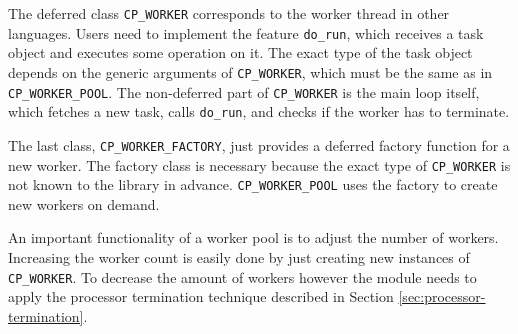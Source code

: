 The deferred class \lstinline!CP_WORKER! corresponds to the worker thread in other languages.
Users need to implement the feature \lstinline!do_run!, which receives a task object and executes some operation on it.
The exact type of the task object depends on the generic arguments of \lstinline!CP_WORKER!, which must be the same as in \lstinline!CP_WORKER_POOL!.
The non-deferred part of \lstinline!CP_WORKER! is the main loop itself, which fetches a new task, calls \lstinline!do_run!, and checks if the worker has to terminate.

The last class, \lstinline!CP_WORKER_FACTORY!, just provides a deferred factory function for a new worker.
The factory class is necessary because the exact type of \lstinline!CP_WORKER! is not known to the library in advance.
\lstinline!CP_WORKER_POOL! uses the factory to create new workers on demand.


An important functionality of a worker pool is to adjust the number of workers.
Increasing the worker count is easily done by just creating new instances of \lstinline!CP_WORKER!.
To decrease the amount of workers however the module needs to apply the processor termination technique described in Section \ref{sec:processor-termination}.


% 
% 
% 
% 
%   
%   
% 
% 
% 


